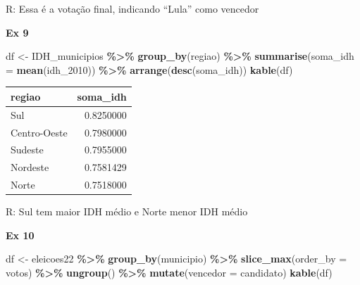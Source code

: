 \documentclass[
]{article}
\newenvironment{Shaded}{\begin{snugshade}}{\end{snugshade}}
\newcommand{\AttributeTok}[1]{\textcolor[rgb]{0.13,0.29,0.53}{#1}}
\newcommand{\FunctionTok}[1]{\textcolor[rgb]{0.13,0.29,0.53}{\textbf{#1}}}
\newcommand{\NormalTok}[1]{#1}
\newcommand{\OtherTok}[1]{\textcolor[rgb]{0.56,0.35,0.01}{#1}}
\newcommand{\SpecialCharTok}[1]{\textcolor[rgb]{0.81,0.36,0.00}{\textbf{#1}}}
\begin{document}
R: Essa é a votação final, indicando ``Lula'' como vencedor

\textbf{Ex 9}

\begin{Shaded}
\begin{Highlighting}[]
\NormalTok{df }\OtherTok{\textless{}{-}}\NormalTok{ IDH\_municipios }\SpecialCharTok{\%\textgreater{}\%}
  \FunctionTok{group\_by}\NormalTok{(regiao) }\SpecialCharTok{\%\textgreater{}\%}
  \FunctionTok{summarise}\NormalTok{(}\AttributeTok{soma\_idh =} \FunctionTok{mean}\NormalTok{(idh\_2010)) }\SpecialCharTok{\%\textgreater{}\%}
  \FunctionTok{arrange}\NormalTok{(}\FunctionTok{desc}\NormalTok{(soma\_idh))}
\FunctionTok{kable}\NormalTok{(df)}
\end{Highlighting}
\end{Shaded}

\begin{longtable}[]{@{}lr@{}}
\toprule\noalign{}
regiao & soma\_idh \\
\midrule\noalign{}
\endhead
\bottomrule\noalign{}
\endlastfoot
Sul & 0.8250000 \\
Centro-Oeste & 0.7980000 \\
Sudeste & 0.7955000 \\
Nordeste & 0.7581429 \\
Norte & 0.7518000 \\
\end{longtable}

R: Sul tem maior IDH médio e Norte menor IDH médio

\textbf{Ex 10}

\begin{Shaded}
\begin{Highlighting}[]
\NormalTok{df }\OtherTok{\textless{}{-}}\NormalTok{ eleicoes22 }\SpecialCharTok{\%\textgreater{}\%}
  \FunctionTok{group\_by}\NormalTok{(municipio) }\SpecialCharTok{\%\textgreater{}\%}
  \FunctionTok{slice\_max}\NormalTok{(}\AttributeTok{order\_by =}\NormalTok{ votos) }\SpecialCharTok{\%\textgreater{}\%}
  \FunctionTok{ungroup}\NormalTok{() }\SpecialCharTok{\%\textgreater{}\%}
  \FunctionTok{mutate}\NormalTok{(}\AttributeTok{vencedor =}\NormalTok{ candidato)}
\FunctionTok{kable}\NormalTok{(df)}
\end{Highlighting}
\end{Shaded}
\end{document}
